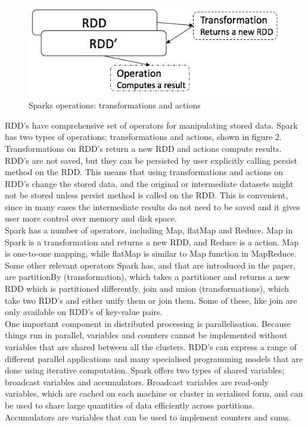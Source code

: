 \documentclass{article}
\theoremstyle{definition}
\begin{document}
\begin{figure}[H]
\centering
\includegraphics[scale=0.5]{RDD}
\caption{Sparks operations: transformations and actions}
\end{figure}

RDD's have comprehensive set of operators for manipulating stored data. Spark has two types of operations; transformations and actions, shown in figure 2. Transformations on RDD's return a new RDD and actions compute results. RDD's are not saved, but they can be persisted by user explicitly calling persist method on the RDD. This means that using transformations and actions on RDD's change the stored data, and the original or intermediate datasets might not be stored unless persist method is called on the RDD. This is convenient, since in many cases the intermediate results do not need to be saved and it gives user more control over memory and disk space. \\

Spark has a number of operators, including Map, flatMap and Reduce. Map in Spark is a transformation and returns a new RDD, and Reduce is a action. Map is one-to-one mapping, while flatMap is similar to Map function in MapReduce. Some other relevant operators Spark has, and that are introduced in the paper, are partitionBy (transformation), which takes a partitioner and returns a new RDD which is partitioned differently, join and union (transformations), which take two RDD's and either unify them or join them. Some of these, like join are only available on RDD's of key-value pairs. \\

One important component in distributed processing is parallelisation. Because things run in parallel, variables and counters cannot be implemented without variables that are shared between all the clusters. RDD's can express a range of different parallel applications and many specialised programming models that are done using iterative computation. Spark offers two types of shared variables; broadcast variables and accumulators. Broadcast variables are read-only variables, which are cached on each machine or cluster in serialised form, and can be used to share large quantities of data efficiently across partitions. Accumulators are variables that can be used to implement counters and sums.  \\ 
\end{document}
